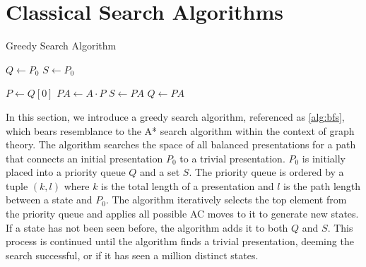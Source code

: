 
\section{Classical Search Algorithms} \label{sec:search}

\begin{algorithm}
	\caption{Greedy Search Algorithm}\label{alg:bfs}
	\begin{algorithmic}
		\State $Q \gets P_0$ 
		\State $S \gets P_0$ 

		 
		\State $P \gets Q[0]$ 
		\State $PA \gets A \cdot P$ 
		\State $S \gets PA$
		\State $Q \gets PA$ 

		\EndIf
		\EndFor
		\EndWhile
	\end{algorithmic}
\end{algorithm}



In this section, we introduce a greedy search algorithm, referenced as \autoref{alg:bfs}, which bears resemblance to the A* search algorithm within the context of graph theory. The algorithm searches the space of all balanced presentations for a path that connects an initial presentation $P_0$ to a trivial presentation.
$P_0$ is initially placed into a priority queue $Q$ and a set $S$. The priority queue is ordered by a tuple $(k, l)$ where $k$ is the total length of a presentation and $l$ is the path length between a state and $P_0$. The algorithm iteratively selects the top element from the priority queue and applies all possible AC moves to it to generate new states. If a state has not been seen before, the algorithm adds it to both $Q$ and $S$. This process is continued until the algorithm finds a trivial presentation, deeming the search successful, or if it has seen a million distinct states. 
\newline

